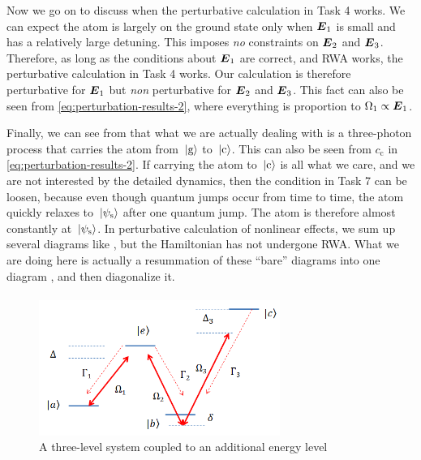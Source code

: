 \documentclass[hyperref, a4paper]{article}
\begin{document}
Now we go on to discuss when the perturbative calculation in Task 4 works. We can expect the atom is largely on 
the ground state only when $\vb*{E}_1$ is small and has a relatively large detuning. This imposes \emph{no} 
constraints on $\vb*{E}_2$ and $\vb*{E}_3$. Therefore, as long as the conditions about $\vb*{E}_1$ are 
correct, and RWA works, the perturbative calculation in Task 4 works. Our calculation is therefore 
perturbative for $\vb*{E}_1$ but \emph{non} perturbative for $\vb*{E}_2$ and $\vb*{E}_3$. This fact can also 
be seen from \eqref{eq:perturbation-results-2}, where everything is proportion to $\Omega_1 \propto \vb*{E}_1$.

Finally, we can see from  that what we are actually dealing with is a three-photon 
process that carries the atom from $\ket*{\text{g}}$ to $\ket*{\text{c}}$. This can also be seen from 
$c_\text{c}$ in \eqref{eq:perturbation-results-2}. If carrying the atom to $\ket*{\text{c}}$ is all what 
we care, and we are not interested by the detailed dynamics, then the condition in Task 7 can be loosen, 
because even though quantum jumps occur from time to time, the atom quickly relaxes to $\ket*{\psi_\text{s}}$
after one quantum jump. The atom is therefore almost constantly at $\ket*{\psi_\text{s}}$.
In perturbative calculation of nonlinear effects, we sum up several diagrams like , but 
the Hamiltonian has not undergone RWA. What we are doing here is actually a resummation of these ``bare'' diagrams
into one diagram , and then diagonalize it.

\paragraph{}

\begin{figure}
    \centering
    \includegraphics[width=0.7\textwidth]{fig3.png}
    \caption{A three-level system coupled to an additional energy level}
    \label{fig:sys-3}
\end{figure}
\end{document}
